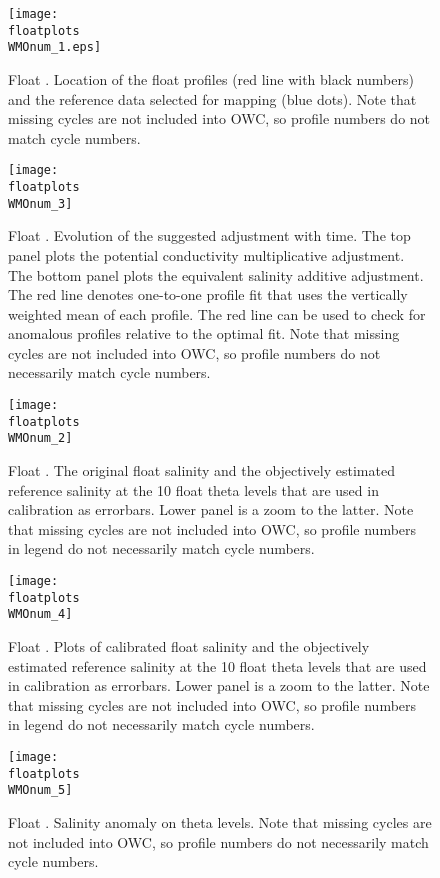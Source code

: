 \documentclass{article}
\begin{document}
\begin{figure}[ph]
  \centering    
  \texttt{[image: \\floatplots\\WMOnum\_1.eps]}
  \caption{Float \WMOnum. Location of the float profiles (red line with
    black numbers) and the reference data selected for mapping (blue
    dots).
    Note that missing cycles are not included into OWC, so profile numbers do
    not match cycle numbers.}
  \label{trajectory}
\end{figure}
\begin{figure}[ph]
    \centering    
    \texttt{[image: \\floatplots\\WMOnum\_3]}
    \caption{Float \WMOnum. Evolution of the suggested adjustment with
      time. The top panel plots the potential conductivity multiplicative
      adjustment. The bottom panel plots the equivalent salinity additive
      adjustment. The red line denotes one-to-one profile fit that uses the
      vertically weighted mean of each profile. The red line can be used to
      check for anomalous profiles relative to the optimal fit.
      Note that missing cycles are not included into OWC, so profile numbers do
      not necessarily match cycle numbers.} 
    \label{SalWithErrors}
\end{figure}
\begin{figure}[p]
    \centering    
    \texttt{[image: \\floatplots\\WMOnum\_2]}
    \caption{Float \WMOnum. The original float salinity and the
      objectively estimated reference salinity at the 10 float theta
      levels that are used in calibration as errorbars. Lower panel is a
      zoom to the latter.
      Note that missing cycles are not included into OWC, so profile
      numbers in legend do not necessarily match cycle numbers.}
    \label{uncalibVsSalinity}
\end{figure}
\begin{figure}[p]
    \centering    
    \texttt{[image: \\floatplots\\WMOnum\_4]}
    \caption{Float \WMOnum. Plots of calibrated float salinity and the
      objectively estimated reference salinity at the 10 float theta
      levels that are used in calibration as errorbars. Lower panel is a
      zoom to the latter.
      Note that missing cycles are not included into OWC, so profile
      numbers in legend do not necessarily match cycle numbers.}
    \label{CalibVsSalinity}
\end{figure}
\begin{figure}[p]
    \centering     
    \texttt{[image: \\floatplots\\WMOnum\_5]}
    \caption{Float \WMOnum. Salinity anomaly on theta levels.
      Note that missing cycles are not included into OWC, so profile numbers do
      not necessarily match cycle numbers.}
    \label{SalAnomOnTheta}
\end{figure}
\end{document}
